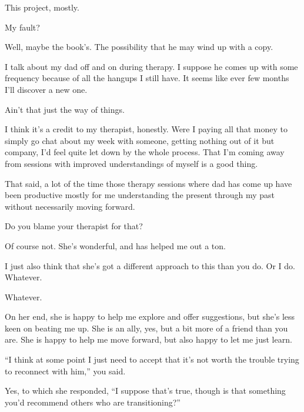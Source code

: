 This project, mostly.

\begin{ally}
  My fault?
\end{ally}

Well, maybe the book's. The possibility that he may wind up with a copy.

I talk about my dad off and on during therapy. I suppose he comes up with some frequency because of all the hangups I still have. It seems like ever few months I'll discover a new one.

\begin{ally}
  Ain't that just the way of things.
\end{ally}

I think it's a credit to my therapist, honestly. Were I paying all that money to simply go chat about my week with someone, getting nothing out of it but company, I'd feel quite let down by the whole process. That I'm coming away from sessions with improved understandings of myself is a good thing.

That said, a lot of the time those therapy sessions where dad has come up have been productive mostly for me understanding the present through my past without necessarily moving forward.

\begin{ally}
  Do you blame your therapist for that?
\end{ally}

Of course not. She's wonderful, and has helped me out a ton.

I just also think that she's got a different approach to this than you do. Or I do. Whatever.

\begin{ally}
  Whatever.
\end{ally}

On her end, she is happy to help me explore and offer suggestions, but she's less keen on beating me up. She is an ally, yes, but a bit more of a friend than you are. She is happy to help me move forward, but also happy to let me just learn.

\begin{ally}
  ``I think at some point I just need to accept that it's not worth the trouble trying to reconnect with him,'' you said.
\end{ally}

Yes, to which she responded, ``I suppose that's true, though is that something you'd recommend others who are transitioning?''

